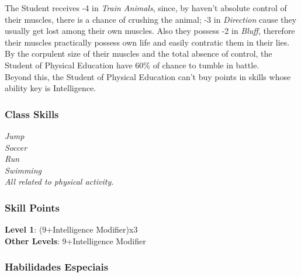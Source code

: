 \documentclass[ letterpaper,12pt]{article}
\begin{document}
The  Student  receives  -4 in {\it Train Animals}, since, by haven't absolute control of their muscles,  there  is  a chance of crushing the animal; -3 in {\it Direction} cause they usually get lost among their own muscles. Also  they possess -2 in {\it Bluff}, therefore their muscles practically possess own life and easily contratic them in their lies. \\

By  the  corpulent size of their muscles and the total absence of control, the Student of Physical Education have 60\% of chance to tumble in battle.\\

Beyond this, the Student of Physical Education can't buy points in skills whose ability key is Intelligence.\\

\subsubsection{Class Skills}
{\it Jump\\
Soccer\\
Run\\
Swimming\\
All related to physical activity.}

\subsubsection{Skill Points}
{\bf Level 1}: (9+Intelligence Modifier)x3\\
{\bf Other Levels}: 9+Intelligence Modifier\\

\subsubsection{Habilidades Especiais}
\end{document}
